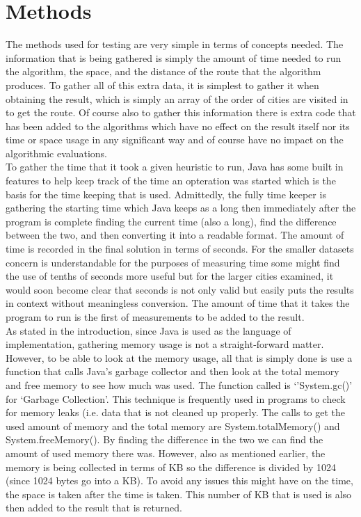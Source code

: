 \documentclass[midd]{thesis}
\newcommand{\tab}{\hspace*{2em}}
\begin{document}
\section{Methods}
\tab The methods used for testing are very simple in terms of concepts needed. The information that is being gathered is simply the amount of time needed to run the algorithm, the space, and the distance of the route that the algorithm produces. To gather all of this extra data, it is simplest to gather it when obtaining the result, which is simply an array of the order of cities are visited in to get the route. Of course also to gather this information there is extra code that has been added to the algorithms which have no effect on the result itself nor its time or space usage in any significant way and of course have no impact on the algorithmic evaluations.\\
\tab To gather the time that it took a given heuristic to run, Java has some built in features to help keep track of the time an opteration was started which is the basis for the time keeping that is used. Admittedly, the fully time keeper is gathering the starting time which Java keeps as a long then immediately after the program is complete finding the current time (also a long), find the difference between the two, and then converting it into a readable format. The amount of time is recorded in the final solution in terms of seconds. For the smaller datasets concern is understandable for the purposes of measuring time some might find the use of tenths of seconds more useful but for the larger cities examined, it would soon become clear that seconds is not only valid but easily puts the results in context without meaningless conversion. The amount of time that it takes the program to run is the first of measurements to be added to the result.\\
\tab As stated in the introduction, since Java is used as the language of implementation, gathering memory usage is not a straight-forward matter. However, to be able to look at the memory usage, all that is simply done is use a function that calls Java's garbage collector and then look at the total memory and free memory to see how much was used. The function called is `'System.gc()'  for `Garbage Collection'. This technique is frequently used in programs to check for memory leaks (i.e. data that is not cleaned up properly. The calls to get the used amount of memory and the total memory are System.totalMemory() and System.freeMemory(). By finding the difference in the two we can find the amount of used memory there was. However, also as mentioned earlier, the memory is being collected in terms of KB so the difference is divided by 1024 (since 1024 bytes go into a KB). To avoid any issues this might have on the time, the space is taken after the time is taken. This number of KB that is used is also then added to the result that is returned.\\
\end{document}
